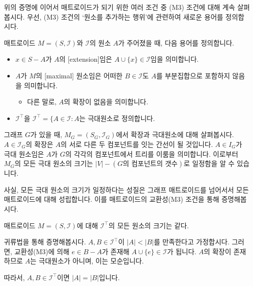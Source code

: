 \documentclass[11pt, a4paper]{book}
\newcommand{\I}{\mathcal{I}}
\begin{document}
    위의 증명에 이어서 매트로이드가 되기 위한 여러 조건 중 (M3) 조건에 대해 계속 살펴봅시다. 우선, (M3) 조건의 `원소를 추가하는 행위'에 관련하여 새로운 용어를 정의합시다.
    
    \begin{MLDef}
        매트로이드 $M = (S, \I)$와 $\I$의 원소 $A$가 주어졌을 때, 다음 용어를 정의합니다.
        \begin{itemize}
            \item $x \in S - A$가 $A$의 [extension]임은 $A \cup \{x\} \in \I$임을 의미합니다.
            \item $A$가 $M$의 [maximal] 원소임은 어떠한 $B \in \I$도 $A$를 부분집합으로 포함하지 않음을 의미합니다.
            \begin{itemize}
                \item 다른 말로, $A$의 확장이 없음을 의미합니다.
            \end{itemize}
            \item $\I^\top$을 $\I^\top = \{ A \in \I : A\text{는 극대원소}$로 정의합니다.
        \end{itemize}
    \end{MLDef}
    
    그래프 $G$가 있을 때, $M_G = (S_G, \I_G)$에서 확장과 극대원소에 대해 살펴봅시다. $A \in \I_G$의 확장은 $A$의 서로 다른 두 컴포넌트를 잇는 간선이 될 것입니다. $A \in I_G$가 극대 원소임은 $A$가 $G$의 각각의 컴포넌트에서 트리를 이룸을 의미합니다. 이로부터 $M_G$의 모든 극대 원소의 크기는 $|V| - (G\text{의 컴포넌트의 갯수})$로 일정함을 알 수 있습니다.
    
    사실, 모든 극대 원소의 크기가 일정하다는 성질은 그래프 매트로이드를 넘어서서 모든 매트로이드에 대해 성립합니다. 이를 매트로이드의 교환성(M3) 조건을 통해 증명해봅시다.
    
    \begin{MLPrp}
        매트로이드 $M = (S, \I)$에 대해 $\I^\top$의 모든 원소의 크기는 같다.
    \end{MLPrp}
    
    \begin{MLPrf}
        귀류법을 통해 증명해봅시다. $A, B \in \I^\top$이 $|A| < |B|$를 만족한다고 가정합시다. 그러면, 교환성(M3)에 의해 $e \in B-A$가 존재해 $A \cup \{e\} \in \I$가 됩니다. $A$의 확장이 존재하므로 $A$는 극대원소가 아니며, 이는 모순입니다.
        
        따라서, $A, B \in \I^\top$이면 $|A| = |B|$입니다.
    \end{MLPrf}
    
\end{document}
